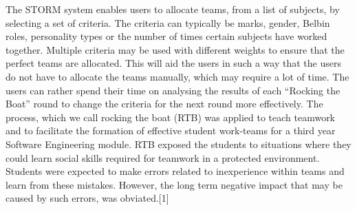 The STORM system enables users to allocate teams, from a list of subjects, by selecting a set of criteria. The criteria can typically be marks, gender, Belbin roles, personality types or the number of times certain subjects have worked together. Multiple criteria may be used with different weights to ensure that the perfect teams are allocated. This will aid the users in such a way that the users do not have to allocate the teams manually, which may require a lot of time. The users can rather spend their time on analysing the results of each ``Rocking the Boat'' round to change the criteria for the next round more effectively. The process, which we call
rocking the boat
(RTB) was
applied to teach teamwork and to facilitate the formation
of effective student work-teams for a third year Software Engineering module.
RTB exposed the students to situations where they could
learn social skills required for teamwork in a protected environment. Students were expected to make errors related
to inexperience within teams and learn from these mistakes.
However, the long term negative impact that may be caused
by such errors, was obviated.[1]

\par

